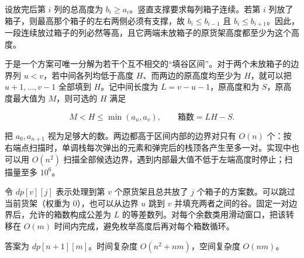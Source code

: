 \Legend
设放完后第 $i$ 列的总高度为 $b_i\ge a_i$。竖直支撑要求每列箱子连续。若第 $i$ 列放了箱子，则最高那个箱子的左右两侧必须有支撑，故 $b_i\le b_{i-1}$ 且 $b_i\le b_{i+1}$。因此，一段连续放过箱子的列必然等高，且它两端未放箱子的原货架高度都至少为这个高度。

于是一个方案可唯一分解为若干个互不相交的“填谷区间”。对于两个未放箱子的边界列 $u<v$，若中间各列均低于高度 $H$、而两边的原高度均至少为 $H$，就可以把 $u+1,\ldots,v-1$ 全部填到 $H$。记中间长度为 $L=v-u-1$，原高度和为 $S$，原高度最大值为 $M$，则可选的 $H$ 满足

$$
M < H \le \min(a_u,a_v), \qquad \text{箱数}=LH-S.
$$

把 $a_0,a_{n+1}$ 视为足够大的数。两边都高于区间内部的边界对只有 $O(n)$ 个：按右端点扫描时，单调栈每次弹出的元素和弹完后的栈顶各产生至多一对。实现中也可以用 $O(n^2)$ 扫描全部候选边界，遇到内部最大值不低于左端高度时停止；扫描量至多 $10^6$。

令 $dp[v][j]$ 表示处理到第 $v$ 个原货架且总共放了 $j$ 个箱子的方案数。可以跳过当前货架（权重为 $0$），也可以从边界 $u$ 跳到 $v$ 并填充两者之间的谷。固定一对边界后，允许的箱数构成公差为 $L$ 的等差数列。对每个余数类用滑动窗口，把该转移在 $O(m)$ 时间内完成，避免枚举高度后再对每个箱数循环。

答案为 $dp[n+1][m]$。时间复杂度 $O(n^2+nm)$，空间复杂度 $O(nm)$。
